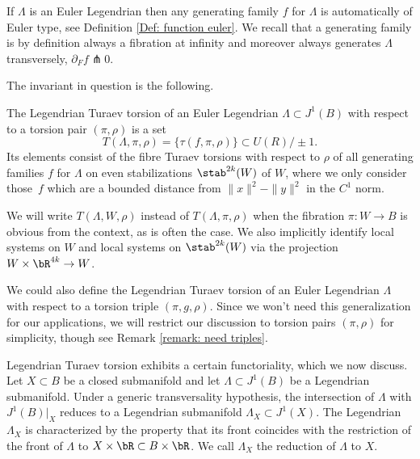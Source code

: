 \begin{remark} If $\Lambda$ is an Euler Legendrian then any generating family $f$ for $\Lambda$ is automatically of Euler type, see Definition \ref{Def: function euler}. We recall that a generating family is by definition always a fibration at infinity and moreover always generates $\Lambda$ transversely, \ie $\partial_F f \pitchfork 0$.
\end{remark}

The invariant in question is the following.

\begin{definition}
The Legendrian Turaev torsion of an Euler Legendrian $\Lambda\!\subset\!J^1(B)$ with respect to a torsion pair $(\pi, \rho)$ is a set
\[
T(\Lambda, \pi, \rho) = \{ \tau(f, \pi, \rho) \} \subset U(R) / \pm 1.
\]
Its elements consist of the fibre Turaev torsions with respect to $\rho$ of all generating families $f$ for $\Lambda$ on even stabilizations $\stab ^{2k}(W)$ of $W$, where we only consider those~$f$ which are a bounded distance from $\|x\|^2-\|y\|^2$ in the $C^1$ norm.
\end{definition}

\begin{remark}
We will write $T(\Lambda, W, \rho)$ instead of $T(\Lambda, \pi, \rho)$ when the fibration $\pi : W \to B$ is obvious from the context, as is often the case. We also implicitly identify local systems on $W$ and local systems on $\stab ^{2k}(W)$ via the projection $W \times \bR^{4k} \to W$.
\end{remark}

\begin{remark}
We could also define the Legendrian Turaev torsion of an Euler Legendrian $\Lambda$ with respect to a torsion triple $(\pi, g, \rho)$. Since we won't need this generalization for our applications, we will restrict our discussion to torsion pairs $(\pi, \rho)$ for simplicity, though see Remark \ref{remark: need triples}.
\end{remark}

Legendrian Turaev torsion exhibits a certain functoriality, which we now discuss. Let $X \subset B$ be a closed submanifold and let $\Lambda \subset J^1(B)$ be a Legendrian submanifold. Under a generic transversality hypothesis, the intersection of $\Lambda$ with $J^1(B)|_X$ reduces to a Legendrian submanifold $\Lambda_X \subset J^1(X)$. The Legendrian $\Lambda_X$ is characterized by the property that its front coincides with the restriction of the front of $\Lambda$ to $X \times \bR \subset B \times \bR$. We call $\Lambda_X$ the reduction of $\Lambda$ to $X$.


